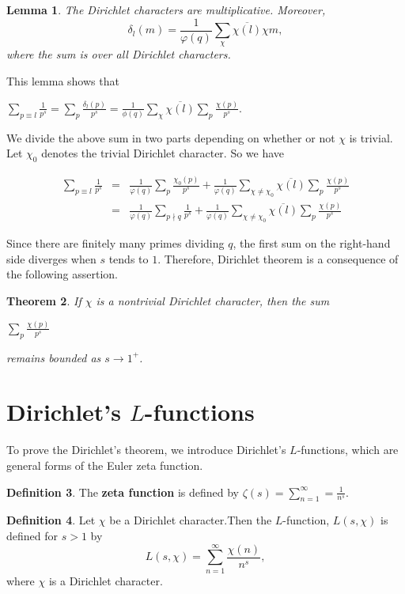 \documentclass[psamsfonts]{amsart}
\newtheorem{thm}{Theorem}[section]
\newtheorem{lem}[thm]{Lemma}
\theoremstyle{definition}
\newtheorem{defn}[thm]{Definition}
\theoremstyle{remark}
\numberwithin{equation}{section}
\begin{document}
			\begin{lem}
				The Dirichlet characters are multiplicative. Moreover,
				\begin{equation}
					\delta_l(m) = \frac{1}{\varphi(q)} \sum_{\chi} \overline{\chi(l)} \chi{m},
				\end{equation}
				where the sum is over all Dirichlet characters.
			\end{lem}			
			This lemma shows that
			\begin{center}
				$\sum_{p \equiv l} \frac{1}{p^s} = \sum_{p} \frac{\delta_l(p)}{p^s} = \frac{1}{\phi(q)} \sum_{\chi} \overline{\chi(l)} \sum_{p} \frac{\chi(p)}{p^s}$.
			\end{center}
			
			We divide the above sum in two parts depending on whether or not $\chi$ is trivial. Let $\chi_0$ denotes the trivial Dirichlet character. So we have
			
			\begin{eqnarray}
				\sum_{p \equiv l} \frac{1}{p^s} &=& \frac{1}{\varphi(q)} \sum_{p} \frac{\chi_0(p)}{p^s} + \frac{1}{\varphi(q)} \sum_{\chi \neq \chi_0} \overline{\chi(l)} \sum_{p} \frac{\chi(p)}{p^s} \nonumber \\
				&=& \frac{1}{\varphi(q)} \sum_{p \nmid q} \frac{1}{p^s} + \frac{1}{\varphi(q)} \sum_{\chi \neq \chi_0} \overline{\chi(l)} \sum_{p} \frac{\chi(p)}{p^s}
			\end{eqnarray}
			
			Since there are finitely many primes dividing $q$, the first sum on the right-hand side diverges when $s$ tends to $1$. Therefore, Dirichlet theorem is a consequence of the following assertion.
			
			\begin{thm}
				If $\chi$ is a nontrivial Dirichlet character, then the sum
				\begin{center}
					$\sum_{p} \frac{\chi(p)}{p^s}$
				\end{center}
			\vspace{1mm}
			remains bounded as $s \rightarrow 1^+$.
			\end{thm}
			
		\section{Dirichlet's $L$-functions}
		To prove the Dirichlet's theorem, we introduce Dirichlet's $L$-functions, which are general forms of the Euler 
zeta function.
			\begin{defn}
				The \textbf{zeta function} is defined by $\zeta(s) = \sum_{n=1}^{\infty} =\frac{1}{n^s}$.
			\end{defn}		
			\begin{defn}
				Let $\chi$ be a Dirichlet character.Then the $L$-function, $L(s,\chi)$ is defined for $s > 1$ by
				\begin{equation}
					L(s,\chi) = \sum_{n=1}^{\infty} \frac{\chi(n)}{n^s},
				\end{equation}
				where $\chi$ is a Dirichlet character.
			\end{defn}
			
\end{document}
